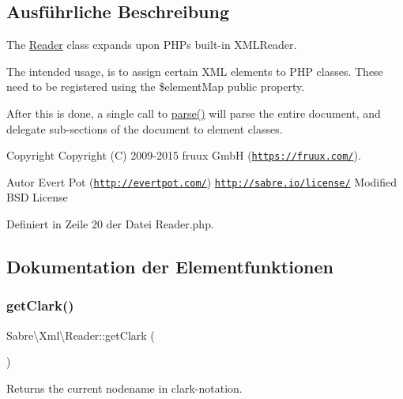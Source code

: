 \subsection{Ausführliche Beschreibung}
The \mbox{\hyperlink{class_sabre_1_1_xml_1_1_reader}{Reader}} class expands upon P\+HP\textquotesingle{}s built-\/in X\+M\+L\+Reader.

The intended usage, is to assign certain X\+ML elements to P\+HP classes. These need to be registered using the \$element\+Map public property.

After this is done, a single call to \mbox{\hyperlink{class_sabre_1_1_xml_1_1_reader_af918d81cafeab81a7e1eab0c32c25da7}{parse()}} will parse the entire document, and delegate sub-\/sections of the document to element classes.

\begin{DoxyCopyright}{Copyright}
Copyright (C) 2009-\/2015 fruux GmbH (\href{https://fruux.com/}{\tt https\+://fruux.\+com/}). 
\end{DoxyCopyright}
\begin{DoxyAuthor}{Autor}
Evert Pot (\href{http://evertpot.com/}{\tt http\+://evertpot.\+com/})  \href{http://sabre.io/license/}{\tt http\+://sabre.\+io/license/} Modified B\+SD License 
\end{DoxyAuthor}


Definiert in Zeile 20 der Datei Reader.\+php.



\subsection{Dokumentation der Elementfunktionen}
\mbox{\label{class_sabre_1_1_xml_1_1_reader_ac55a1656052682d30a6f43aeb48220ca}} 
\subsubsection{\texorpdfstring{get\+Clark()}{getClark()}}
{\footnotesize\ttfamily Sabre\textbackslash{}\+Xml\textbackslash{}\+Reader\+::get\+Clark (\begin{DoxyParamCaption}{ }\end{DoxyParamCaption})}

Returns the current nodename in clark-\/notation.

